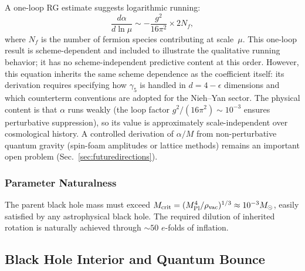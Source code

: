 \documentclass[aps,prd,twocolumn,superscriptaddress,showpacs,preprintnumbers,nofootinbib,longbibliography,floatfix]{revtex4-2}
\begin{document}
A one-loop RG estimate suggests logarithmic running:
\begin{equation}\label{eq:RGflow}
\frac{d\alpha}{d\ln\mu} \sim -\frac{g^2}{16\pi^2}\times 2N_f,
\end{equation}
where $N_f$ is the number of fermion species contributing at scale~$\mu$. This one-loop result is scheme-dependent and included to illustrate the qualitative running behavior; it has no scheme-independent predictive content at this order. However, this equation inherits the same scheme dependence as the coefficient itself: its derivation requires specifying how $\gamma_5$ is handled in $d=4-\epsilon$ dimensions and which counterterm conventions are adopted for the Nieh--Yan sector. The physical content is that $\alpha$ runs weakly (the loop factor $g^2/(16\pi^2)\sim 10^{-3}$ ensures perturbative suppression), so its value is approximately scale-independent over cosmological history. A controlled derivation of $\alpha/M$ from non-perturbative quantum gravity (spin-foam amplitudes or lattice methods) remains an important open problem (Sec.~\ref{sec:futuredirections}).


\subsubsection{Parameter Naturalness}\label{sec:naturalness}
The parent black hole mass must exceed $M_{\rm crit} = (M_{\rm Pl}^4/\rho_{\rm vac})^{1/3}\approx 10^{-3}M_\odot$, easily satisfied by any astrophysical black hole. The required dilution of inherited rotation is naturally achieved through $\sim 50$ $e$-folds of inflation.


\subsection{Black Hole Interior and Quantum Bounce}\label{sec:bounce}
\end{document}
